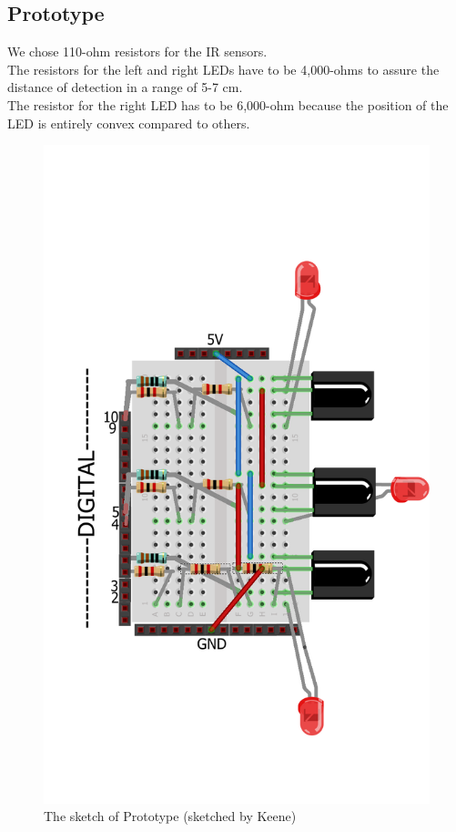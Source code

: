 \documentclass{article}
\begin{document}
\subsection{Prototype}
We chose 110-ohm resistors for the IR sensors.\\
The resistors for the left and right LEDs have to be 4,000-ohms to assure the distance of detection in a range of 5-7 cm.\\
The resistor for the right LED has to be 6,000-ohm because the position of the LED is entirely convex compared to others.\\
\begin{figure}[h!]
	\centering
	\includegraphics[width=400pt]{pic7.png}
	\caption{The sketch of Prototype (sketched by Keene)}
\end{figure}
\end{document}
